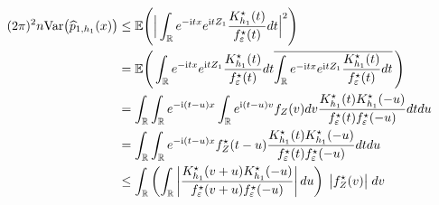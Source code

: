 \documentclass[11pt,a4paper,openany]{article}
\newcommand{\Var}{\mbox{Var}}
\def\R{\mathbb{R}}
\def\E{\mathbb{E}}
\begin{document}
\begin{align*}
	(2 \pi)^{2}  n \Var \big(  \widehat{p}_{1,h_{1}}(x) \big)   %
	& \leq  \E \Bigg(     \Big|  \int_{\R}  e^{- \mathrm{i} t x} e^{ \mathrm{i} t Z_{1}} \dfrac{   K_{h_{1}}^{\star} (t)       }{f_{\varepsilon}^{\star} (t) }   dt  \Big|^2  \Bigg)        
	\\
	& = \E \Bigg(    \int_{\R}  e^{- \mathrm{i}tx} e^{\mathrm{i} t Z_{1}} \dfrac{   K_{h_{1}}^{\star} (t)       }{f_{\varepsilon}^{\star} (t) }   dt    \overline{  \int_{\R}  e^{- \mathrm{i}tx} e^{ \mathrm{i} t Z_{1}} \dfrac{   K_{h_{1}}^{\star} (t)       }{f_{\varepsilon}^{\star} (t) }   dt  } \, \Bigg)   
	\\
	& =  \int_{\R} \int_{\R}  e^{- \mathrm{i} (t-u) x} \int_{\R} e^{ \mathrm{i} (t-u) v} f_{Z}(v) dv \dfrac{   K_{h_{1}}^{\star} (t)    K_{h_{1}}^{\star} (-u)    }{f_{\varepsilon}^{\star} (t)   f_{\varepsilon}^{\star} (-u) }    dt du 
	\\
	& =  \int_{\R} \int_{\R}  e^{- \mathrm{i} (t-u) x}  f^{\star}_{Z}(t-u) \dfrac{   K_{h_{1}}^{\star} (t)    K_{h_{1}}^{\star} (-u)    }{f_{\varepsilon}^{\star} (t)   f_{\varepsilon}^{\star} (-u) }    dt du 
	\\
	&\leq   \int_{\R}  \left(  \int_{\R}  \left|  \dfrac{ K_{h_{1}}^{\star}(v+u)  K_{h_{1}}^{\star}(-u)   }{ f_{\varepsilon}^{\star}(v+u) f_{\varepsilon}^{\star}(-u) }  \right|  du \right)  \hspace{0.1cm}  \big|  f_{Z}^{\star}(v) \big| \hspace{0.1cm} dv

\end{align*}
\end{document}
